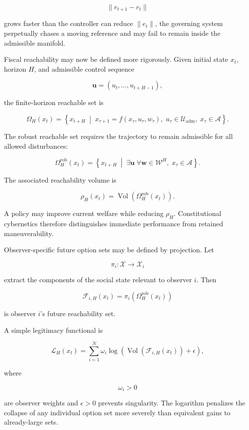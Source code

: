 \documentclass[12pt,a4paper]{article}
\DeclareMathOperator{\Vol}{Vol}
\begin{document}
\[
\|r_{t+1}-r_t\|
\]

grows faster than the controller can reduce \(\|e_t\|\), the governing system perpetually chases a moving reference and may fail to remain inside the admissible manifold.

Fiscal reachability may now be defined more rigorously. Given initial state \(x_t\), horizon \(H\), and admissible control sequence

\[
\mathbf{u}
=
(u_t,\dots,u_{t+H-1}),
\]

the finite-horizon reachable set is

\[
\Omega_H(x_t)
=
\left\{
x_{t+H}
\;\middle|\;
x_{\tau+1}
=
f(x_\tau,u_\tau,w_\tau),
\;
u_\tau\in\mathcal{U}_{\mathrm{adm}},
\;
x_\tau\in\mathcal{A}
\right\}.
\]

The robust reachable set requires the trajectory to remain admissible for all allowed disturbances:

\[
\Omega_H^{\mathrm{rob}}(x_t)
=
\left\{
x_{t+H}
\;\middle|\;
\exists \mathbf{u}
\;
\forall \mathbf{w}\in\mathcal{W}^{H},
\;
x_\tau\in\mathcal{A}
\right\}.
\]

The associated reachability volume is

\[
\rho_H(x_t)
=
\Vol
\left(
\Omega_H^{\mathrm{rob}}(x_t)
\right).
\]

A policy may improve current welfare while reducing \(\rho_H\). Constitutional cybernetics therefore distinguishes immediate performance from retained maneuverability.

Observer-specific future option sets may be defined by projection. Let

\[
\pi_i:\mathcal{X}\rightarrow\mathcal{X}_i
\]

extract the components of the social state relevant to observer \(i\). Then

\[
\mathcal{F}_{i,H}(x_t)
=
\pi_i
\left(
\Omega_H^{\mathrm{rob}}(x_t)
\right)
\]

is observer \(i\)'s future reachability set.

A simple legitimacy functional is

\[
\mathcal{L}_H(x_t)
=
\sum_{i=1}^{N}
\omega_i
\log
\left(
\Vol
\left(
\mathcal{F}_{i,H}(x_t)
\right)
+
\epsilon
\right),
\]

where

\[
\omega_i>0
\]

are observer weights and \(\epsilon>0\) prevents singularity. The logarithm penalizes the collapse of any individual option set more severely than equivalent gains to already-large sets.
\end{document}
